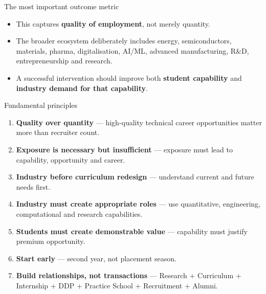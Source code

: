 \documentclass[aspectratio=169,11pt]{beamer}
\newcommand{\key}[1]{\textbf{\color{IITblue}#1}}
\begin{document}
\begin{frame}{The most important outcome metric}
\begin{center}
\end{center}
\vspace{7mm}
\begin{itemize}
\item This captures \key{quality of employment}, not merely quantity.
\item The broader ecosystem deliberately includes energy, semiconductors, materials, pharma, digitalisation, AI/ML, advanced manufacturing, R\&D, entrepreneurship and research.
\item A successful intervention should improve both \key{student capability} and \key{industry demand for that capability}.
\end{itemize}
\end{frame}

\begin{frame}{Fundamental principles}
\begin{enumerate}
\item \key{Quality over quantity} — high-quality technical career opportunities matter more than recruiter count.
\item \key{Exposure is necessary but insufficient} — exposure must lead to capability, opportunity and career.
\item \key{Industry before curriculum redesign} — understand current and future needs first.
\item \key{Industry must create appropriate roles} — use quantitative, engineering, computational and research capabilities.
\item \key{Students must create demonstrable value} — capability must justify premium opportunity.
\item \key{Start early} — second year, not placement season.
\item \key{Build relationships, not transactions} — Research + Curriculum + Internship + DDP + Practice School + Recruitment + Alumni.
\end{enumerate}
\end{frame}
\end{document}

